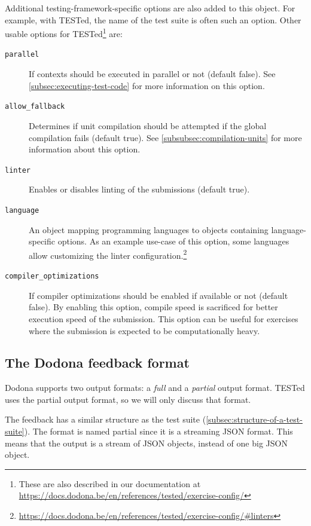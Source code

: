 \documentclass[../main]{subfiles}
\begin{document}
Additional testing-framework-specific options are also added to this object.
For example, with TESTed, the name of the test suite is often such an option.
Other usable options for TESTed\footnote{These are also described in our documentation at \url{https://docs.dodona.be/en/references/tested/exercise-config/}} are:

\begin{description}
    \item[\texttt{parallel}] If contexts should be executed in parallel or not (default false).
        See \cref{subsec:executing-test-code} for more information on this option.
    \item[\texttt{allow\_fallback}] Determines if unit compilation should be attempted if the global compilation fails (default true).
        See \cref{subsubsec:compilation-units} for more information about this option.
    \item[\texttt{linter}] Enables or disables linting of the submissions (default true).
    \item[\texttt{language}] An object mapping programming languages to objects containing language-specific options.
        As an example use-case of this option, some languages allow customizing the linter configuration.\footnote{\url{https://docs.dodona.be/en/references/tested/exercise-config/\#linters}}
    \item[\texttt{compiler\_optimizations}] If compiler optimizations should be enabled if available or not (default false).
        By enabling this option, compile speed is sacrificed for better execution speed of the submission.
        This option can be useful for exercises where the submission is expected to be computationally heavy.
\end{description}

\subsection{The Dodona feedback format}\label{subsec:dodona-output}

Dodona supports two output formats: a \emph{full} and a \emph{partial} output format.
TESTed uses the partial output format, so we will only discuss that format.

The feedback has a similar structure as the test suite (\cref{subsec:structure-of-a-test-suite}).
The format is named partial since it is a streaming JSON format.
This means that the output is a stream of JSON objects, instead of one big JSON object.
\end{document}
